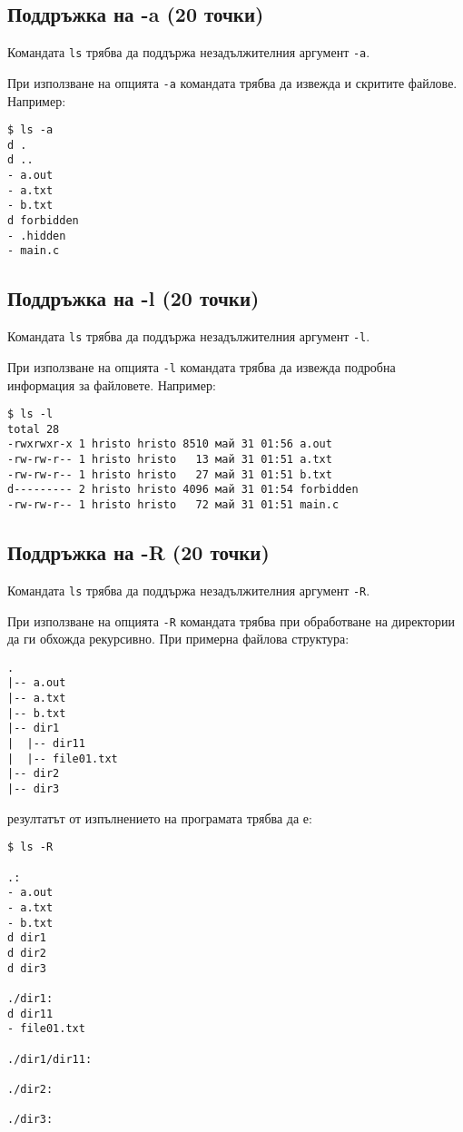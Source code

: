 \documentclass[a4paper,10pt]{article}
\begin{document}
\subsection{Поддръжка на {\ttfamily -a} (20 точки)}
Командата \lstinline{ls} трябва да поддържа незадължителния аргумент \lstinline{-a}.

При използване на опцията \lstinline{-a} командата трябва да извежда и скритите файлове. Например:
\begin{verbatim}
$ ls -a
d .
d ..
- a.out
- a.txt
- b.txt
d forbidden
- .hidden
- main.c
\end{verbatim}

\subsection{Поддръжка на {\ttfamily -l} (20 точки)}
Командата \lstinline{ls} трябва да поддържа незадължителния аргумент \lstinline{-l}.

При използване на опцията \lstinline{-l} командата трябва да извежда подробна информация за файловете. Например:
\begin{verbatim}
$ ls -l
total 28
-rwxrwxr-x 1 hristo hristo 8510 май 31 01:56 a.out
-rw-rw-r-- 1 hristo hristo   13 май 31 01:51 a.txt
-rw-rw-r-- 1 hristo hristo   27 май 31 01:51 b.txt
d--------- 2 hristo hristo 4096 май 31 01:54 forbidden
-rw-rw-r-- 1 hristo hristo   72 май 31 01:51 main.c
\end{verbatim}

\subsection{Поддръжка на {\ttfamily -R} (20 точки)}
Командата \lstinline{ls} трябва да поддържа незадължителния аргумент \lstinline{-R}.

При използване на опцията \lstinline{-R} командата трябва при обработване на директории да ги обхожда рекурсивно. При примерна файлова структура:
\begin{verbatim}
.
|-- a.out
|-- a.txt
|-- b.txt
|-- dir1
|  |-- dir11
|  |-- file01.txt
|-- dir2
|-- dir3
\end{verbatim}
резултатът от изпълнението на програмата трябва да е:
\begin{verbatim}
$ ls -R

.:
- a.out
- a.txt
- b.txt
d dir1
d dir2
d dir3

./dir1:
d dir11
- file01.txt

./dir1/dir11:

./dir2:

./dir3:

\end{verbatim}
\end{document}
